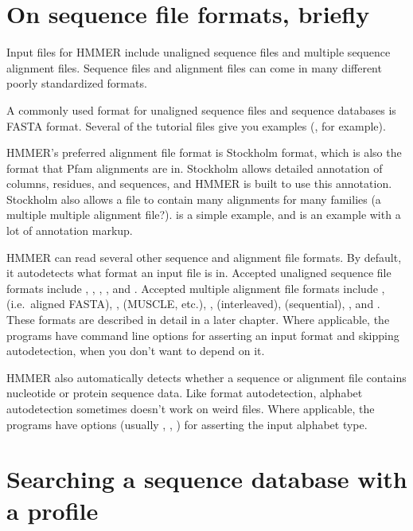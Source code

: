 \section{On sequence file formats, briefly}

Input files for HMMER include unaligned sequence files and multiple
sequence alignment files. Sequence files and alignment files can come
in many different poorly standardized formats.

A commonly used format for unaligned sequence files and sequence
databases is FASTA format. Several of the tutorial files give you
examples (, for example).

HMMER's preferred alignment file format is Stockholm format, which is
also the format that Pfam alignments are in.  Stockholm allows
detailed annotation of columns, residues, and sequences, and HMMER is
built to use this annotation. Stockholm also
allows a file to contain many alignments for many families (a multiple
multiple alignment file?).  is a simple example,
and  is an example with a lot of annotation markup.

HMMER can read several other sequence and alignment file formats. By
default, it autodetects what format an input file is in.  Accepted
unaligned sequence file formats include , ,
, , and . Accepted multiple
alignment file formats include , 
(i.e.\ aligned FASTA), ,  (MUSCLE,
etc.), ,  (interleaved), 
(sequential), , and . These formats are
described in detail in a later chapter. Where applicable, the programs
have command line options for asserting an input format and skipping
autodetection, when you don't want to depend on it.

HMMER also automatically detects whether a sequence or alignment file
contains nucleotide or protein sequence data. Like format
autodetection, alphabet autodetection sometimes doesn't work on weird
files. Where applicable, the programs have options (usually
, , ) for asserting the
input alphabet type.

 

\section{Searching a sequence database with a profile}

